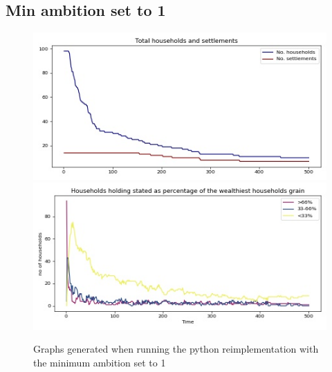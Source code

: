 \documentclass[12pt]{article}
\begin{document}
			\subsection{Min ambition set to 1}
				\begin{figure}[!htb]
					\includegraphics[width=12cm]{Min_ambition_run1_A}\\
					\includegraphics[width=12cm]{Min_ambition_run1_B}
					\caption{Graphs generated when running the python reimplementation with the minimum ambition set to 1}
					\label{fig:Min_Ambition_enabled_ours_1}
				\end{figure}
					
\end{document}
